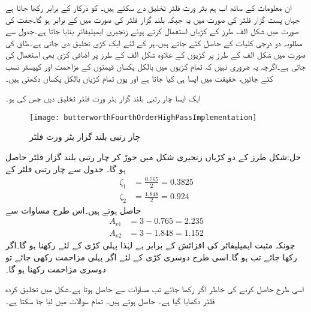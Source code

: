 ان معلومات کے ساتھ اب ہم بٹر ورت فلٹر تخلیق دے سکتے ہیں۔ کو درکار  کے برابر رکھا جاتا ہے جہاں پست گزار فلٹر کی صورت میں یہ  جبکہ بلند گزار فلٹر کی صورت میں  کے برابر ہو گا۔جفت  کی صورت میں شکل  الف طرز کے  کڑیاں استعمال کرتے ہوئے زنجیری ایمپلیفائر بنایا جاتا ہے۔جدول  سے مطلوبہ دو درجی کلیات    کے  حاصل کئے جاتے ہیں۔ہر  کے لئے ایک کڑی تخلیق دی جاتی ہے۔طاق  کی صورت میں شکل  الف کے طرز پر  کڑیوں کے علاوہ شکل  الف کے طرز پر اضافی کڑی بھی استعمال کی جاتی ہے۔اگرچہ یہ ضروری نہیں کہ تمام کڑیوں میں بالکل یکساں قیمتوں کے مزاحمت اور کپیسٹر نسب کئے جائیں، حقیقت میں ایسا ہی کیا جاتا ہے اور یوں تمام کڑیاں بالکل یکساں دکھتی ہیں۔

ایک ایسا چار رتبی بلند گزار بٹر ورت فلٹر تخلیق دیں جس کی  ہو۔

\begin{figure}
\centering
\texttt{[image: butterworthFourthOrderHighPassImplementation]}
\caption{چار رتبی بلند گزار بٹر ورت فلٹر}
\label{شکل_تعددی_ردعمل_بٹر_ورت_فلٹر_بلند_گزار}
\end{figure}
حل:شکل  طرز کے دو کڑیاں زنجیری شکل میں جوڑ کر چار رتبی بلند گزار فلٹر حاصل ہو گا۔ جدول  سے چار رتبی فلٹر کے
\begin{align*}
\zeta_1&=\frac{0.765}{2}=0.3825\\
\zeta_2&=\frac{1.848}{2}=0.924
\end{align*} 
حاصل ہوتے ہیں۔اس طرح مساوات  سے
\begin{align*}
A_{v1}&=3-0.765=2.235\\
A_{v2}&=3-1.848=1.152
\end{align*}
چونکہ مثبت ایمپلیفائر کی افزائش  کے برابر ہے لہٰذا پہلی کڑی کے لئے  رکھنا ہو گا۔اگر  رکھا جائے تب  ہو گا۔اسی طرح دوسری کڑی کے لئے  اگر پہلی مزاحمت  رکھی جائے تو دوسری مزاحمت  رکھنا ہو گا۔

اسی طرح  حاصل کرنے کی خاطر اگر  رکھا جائے تب مساوات  سے   حاصل ہوتا ہے۔شکل  میں تخلیق کردہ فلٹر دکھایا گیا ہے۔  
حاصل ہوتے ہیں۔
\newpage
{}
تمام سوالات میں  لیا جا سکتا ہے۔


